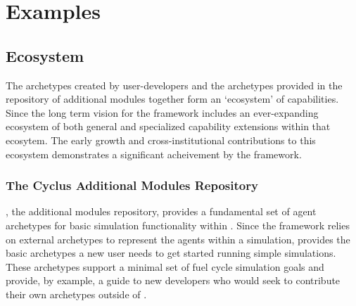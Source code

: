\section{Examples}
%

%


\subsection{Ecosystem}

The archetypes created by user-developers and the archetypes provided in the 
\Cycamore \cite{carlsen_cycamore_2014} repository of additional modules 
together form an `ecosystem' of capabilities. Since the long term vision for 
the \Cyclus framework includes an ever-expanding ecosystem of both general and 
specialized capability extensions within that ecosytem. The early growth and 
cross-institutional contributions to this ecosystem demonstrates a significant 
acheivement by the \Cyclus framework. 

\subsubsection{The Cyclus Additional Modules Repository}

\Cycamore, the \Cyclus additional modules repository, provides a fundamental 
set of agent archetypes for basic simulation functionality within \Cyclus.
Since the \Cyclus framework relies on external archetypes to represent the 
agents within a simulation, 
\Cycamore provides the basic archetypes a new user needs to get started running 
simple simulations. 
These archetypes support a minimal set of fuel cycle simulation goals and 
provide, by example, a guide to new developers who would seek to contribute 
their own archetypes outside of \Cycamore.


